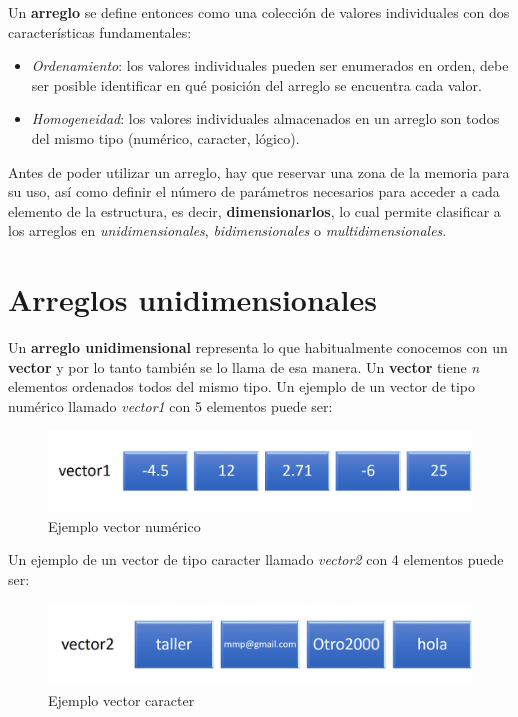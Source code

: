 \documentclass[]{book}
\providecommand{\tightlist}{%
  \setlength{\itemsep}{0pt}\setlength{\parskip}{0pt}}
\begin{document}
Un \textbf{arreglo} se define entonces como una colección de valores
individuales con dos características fundamentales:

\begin{itemize}
\tightlist
\item
  \emph{Ordenamiento}: los valores individuales pueden ser enumerados en
  orden, debe ser posible identificar en qué posición del arreglo se
  encuentra cada valor.
\item
  \emph{Homogeneidad}: los valores individuales almacenados en un
  arreglo son todos del mismo tipo (numérico, caracter, lógico).
\end{itemize}

Antes de poder utilizar un arreglo, hay que reservar una zona de la
memoria para su uso, así como definir el número de parámetros necesarios
para acceder a cada elemento de la estructura, es decir,
\textbf{dimensionarlos}, lo cual permite clasificar a los arreglos en
\emph{unidimensionales}, \emph{bidimensionales} o
\emph{multidimensionales}.

\section{Arreglos unidimensionales}\label{arreglos-unidimensionales}

Un \textbf{arreglo unidimensional} representa lo que habitualmente
conocemos con un \textbf{vector} y por lo tanto también se lo llama de
esa manera. Un \textbf{vector} tiene \emph{n} elementos ordenados todos
del mismo tipo. Un ejemplo de un vector de tipo numérico llamado
\emph{vector1} con 5 elementos puede ser:

\begin{figure}

{\centering \includegraphics[width=0.8\linewidth]{images/10_vector1} 

}

\caption{Ejemplo vector numérico}\label{fig:vector1}
\end{figure}

Un ejemplo de un vector de tipo caracter llamado \emph{vector2} con 4
elementos puede ser:

\begin{figure}

{\centering \includegraphics[width=0.8\linewidth]{images/11_vector2} 

}

\caption{Ejemplo vector caracter}\label{fig:vector2}
\end{figure}
\end{document}

